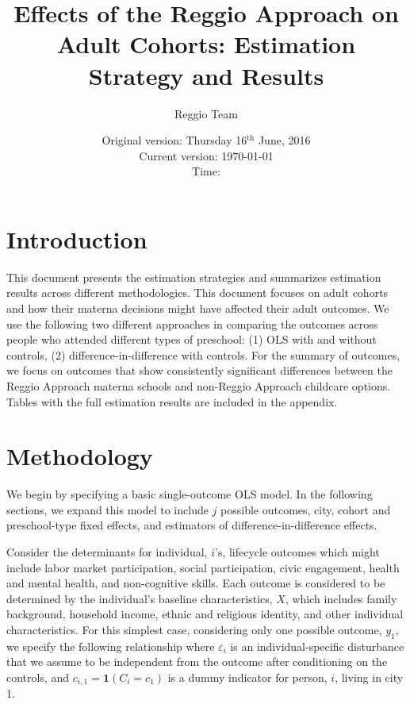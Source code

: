 \documentclass[11pt]{article}
\begin{document}
\title{Effects of the Reggio Approach on Adult Cohorts: Estimation Strategy and Results}
\author{Reggio Team}
\date{Original version: Thursday  16$^{\text{th}}$ June, 2016 \\ Current version: \today \\ \vspace{1em} Time: \currenttime}
\maketitle

\doublespacing

\section{Introduction}

This document presents the estimation strategies and summarizes estimation results across different methodologies. This document focuses on adult cohorts and how their materna decisions might have affected their adult outcomes. We use the following two different approaches in comparing the outcomes across people who attended different types of preschool: (1) OLS with and without controls, (2) difference-in-difference with controls. For the summary of outcomes, we focus on outcomes that show consistently significant differences between the Reggio Approach materna schools and non-Reggio Approach childcare options. Tables with the full estimation results are included in the appendix. 

\section{Methodology}
We begin by specifying a basic single-outcome OLS model. In the following sections, we expand this model to include $j$ possible outcomes, city, cohort and preschool-type fixed effects, and estimators of difference-in-difference effects.

Consider the determinants for individual, $i$'s, lifecycle outcomes which might include labor market participation, social participation, civic engagement, health and mental health, and non-cognitive skills. Each outcome is considered to be determined by the individual's baseline characteristics, $X$, which includes family background, household income, ethnic and religious identity, and other individual characteristics. For this simplest  case, considering only one possible outcome, $y_1$, we specify the following relationship  where $\varepsilon_{i}$ is an individual-specific disturbance that we assume to be independent from the outcome after conditioning on the controls, and $c_{i,1} = \mathbf{1}(C_i = c_1)$ is a dummy indicator for person, $i$, living in city 1.
\end{document}
